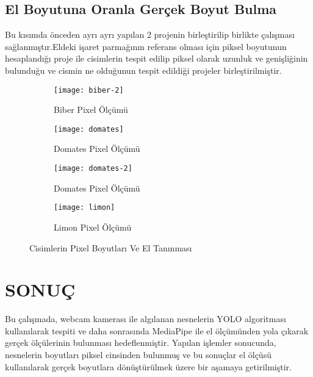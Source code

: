 \documentclass[11pt,a4paper]{report}
\begin{document}
\begin{justify}
  \subsection{El Boyutuna Oranla Gerçek Boyut Bulma}
  Bu kısımda önceden ayrı ayrı yapılan 2 projenin birleştirilip birlikte çalışması sağlanmıştır.Eldeki işaret parmağının referans olması için piksel boyutunun hesaplandığı proje ile cisimlerin tespit edilip piksel olarak uzunluk ve genişliğinin bulunduğu ve cismin ne olduğunun tespit edildiği projeler birleştirilmiştir.
  \vspace{0.2cm}


	\begin{figure}[!h] %
	\centering
	
	\begin{subfigure}[t]{0.45\linewidth}
		\centering
		\texttt{[image: biber-2]}
		\caption{Biber Pixel Ölçümü}
	\end{subfigure}\hfill
	\begin{subfigure}[t]{0.51\linewidth}
		\centering
		\texttt{[image: domates]}
		\caption{Domates Pixel Ölçümü}
	\end{subfigure}
	 \vspace{0.4cm}
	
		\begin{subfigure}[t]{0.45\linewidth}
		\centering
		\texttt{[image: domates-2]}
		\caption{Domates Pixel Ölçümü}
	\end{subfigure}
		\begin{subfigure}[t]{0.48\linewidth}
		\centering
		\texttt{[image: limon]}
		\caption{Limon Pixel Ölçümü}
	\end{subfigure}
	\newline
	
	\caption{Cisimlerin Pixel Boyutları Ve El Tanınması}
\end{figure}
\clearpage


   \end{justify}
   \newpage
   
   
   \section{SONUÇ}	
   Bu çalışmada, webcam kamerası ile algılanan nesnelerin YOLO algoritması kullanılarak tespiti ve daha sonrasında MediaPipe ile el ölçümünden yola çıkarak gerçek ölçülerinin bulunması hedeflenmiştir. Yapılan işlemler sonucunda, nesnelerin boyutları piksel cinsinden bulunmuş ve bu sonuçlar el ölçüsü kullanılarak gerçek boyutlara dönüştürülmek üzere bir aşamaya getirilmiştir.
   \newline
   
\end{document}

